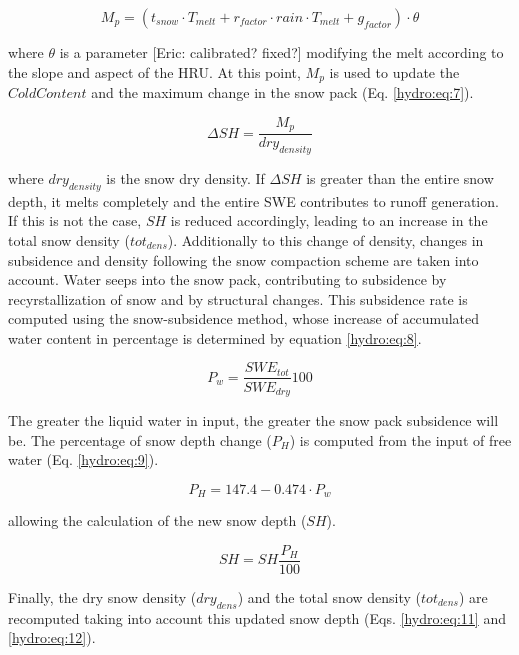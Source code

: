 \begin{equation} \label{hydro:eq:6}
 M_{p} = (t_{snow} \cdot T_{melt} + r_{factor} \cdot rain \cdot T_{melt} + g_{factor}) \cdot \theta
\end{equation} 

where $\theta$ is a parameter [Eric: calibrated? fixed?] modifying the melt according to the slope and aspect of the HRU. At this point, $M_{p}$ is used to update the $ColdContent$ and the maximum change in the snow pack (Eq. \ref{hydro:eq:7}).

\begin{equation} \label{hydro:eq:7}
 \Delta SH = \frac{M_{p}}{dry_{density}}
\end{equation} 

where $dry_{density}$ is the snow dry density. If $\Delta SH$ is greater than the entire snow depth, it melts completely and the entire SWE contributes to runoff generation. If this is not the case, $SH$ is reduced accordingly, leading to an increase in the total snow density ($tot_{dens}$). Additionally to this change of density, changes in subsidence and density following the snow compaction scheme \citep{bertle_effect_1966} are taken into account. Water seeps into the snow pack, contributing to subsidence by recyrstallization of snow and by structural changes. This subsidence rate is computed using the snow-subsidence method, whose increase of accumulated water content in percentage is determined by equation \ref{hydro:eq:8}.

\begin{equation} \label{hydro:eq:8}
 P_{w} = \frac{SWE_{tot}}{SWE_{dry}}100
\end{equation} 

The greater the liquid water in input, the greater the snow pack subsidence will be. The percentage of snow depth change ($P_{H}$) is computed from the input of free water (Eq. \ref{hydro:eq:9}).

\begin{equation} \label{hydro:eq:9}
 P_{H} = 147.4 - 0.474 \cdot P_{w}
\end{equation} 

allowing the calculation of the new snow depth ($SH$).

\begin{equation} \label{hydro:eq:10}
SH = SH\frac{P_{H}}{100}
\end{equation} 

Finally, the dry snow density ($dry_{dens}$) and the total snow density ($tot_{dens}$) are recomputed taking into account this updated snow depth (Eqs. \ref{hydro:eq:11} and \ref{hydro:eq:12}). 

